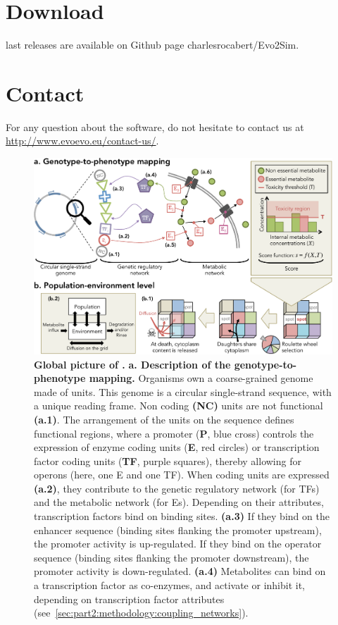 \section{Download}
{\packageName} last releases are available on Github page charlesrocabert/Evo2Sim.

\section{Contact}
For any question about the software, do not hesitate to contact us at\\ \href{http://www.evoevo.eu/contact-us/}{http://www.evoevo.eu/contact-us/}.

\begin{figure}
\centering 
\includegraphics[width=1\textwidth]{figures/general_algorithm.pdf}
\caption[Global picture of {\packageName}.]{\textbf{Global picture of {\packageName}.} \textbf{a. Description of the genotype-to-phenotype mapping.} Organisms own a coarse-grained genome made of units. This genome is a circular single-strand sequence, with a unique reading frame. Non coding \textbf{(NC)} units are not functional \textbf{(a.1)}. The arrangement of the units on the sequence defines functional regions, where a promoter (\textbf{P}, blue cross) controls the expression of enzyme coding units (\textbf{E}, red circles) or transcription factor coding units (\textbf{TF}, purple squares), thereby allowing for operons (here, one E and one TF). When coding units are expressed \textbf{(a.2)}, they contribute to the genetic regulatory network (for TFs) and the metabolic network (for Es).
Depending on their attributes, transcription factors bind on binding sites. \textbf{(a.3)} If they bind on the enhancer sequence (binding sites flanking the promoter upstream), the promoter activity is up-regulated. If they bind on the operator sequence (binding sites flanking the promoter downstream), the promoter activity is down-regulated. \textbf{(a.4)} Metabolites can bind on a transcription factor as co-enzymes, and activate or inhibit it, depending on transcription factor attributes (see~\ref{sec:part2:methodology:coupling_networks}).
}
\end{figure}
